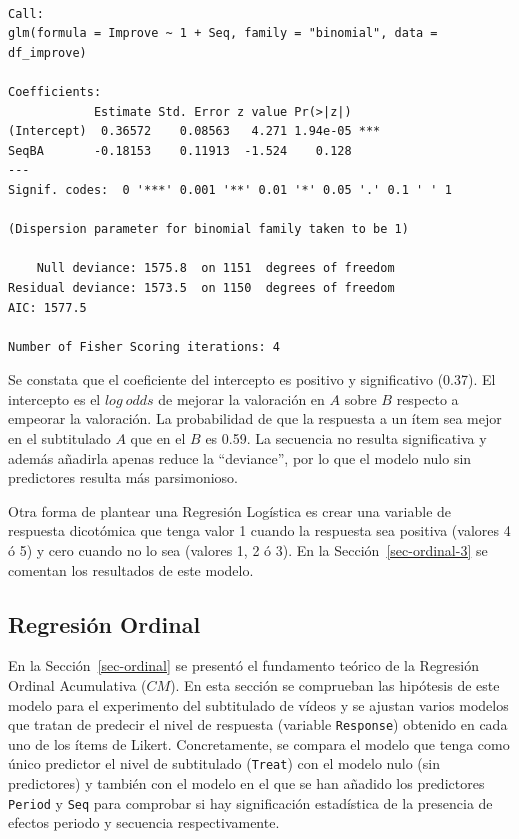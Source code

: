 \documentclass[
  12pt,
  a4paper,
  extrafontsizes,
  onecolumn,
  openright,
  table]{memoir}
\begin{document}
\begin{verbatim}

Call:
glm(formula = Improve ~ 1 + Seq, family = "binomial", data = df_improve)

Coefficients:
            Estimate Std. Error z value Pr(>|z|)    
(Intercept)  0.36572    0.08563   4.271 1.94e-05 ***
SeqBA       -0.18153    0.11913  -1.524    0.128    
---
Signif. codes:  0 '***' 0.001 '**' 0.01 '*' 0.05 '.' 0.1 ' ' 1

(Dispersion parameter for binomial family taken to be 1)

    Null deviance: 1575.8  on 1151  degrees of freedom
Residual deviance: 1573.5  on 1150  degrees of freedom
AIC: 1577.5

Number of Fisher Scoring iterations: 4
\end{verbatim}

\normalsize

Se constata que el coeficiente del intercepto es positivo y
significativo (0.37). El intercepto es el \(log\ odds\) de mejorar la
valoración en \(A\) sobre \(B\) respecto a empeorar la valoración. La
probabilidad de que la respuesta a un ítem sea mejor en el subtitulado
\(A\) que en el \(B\) es 0.59. La secuencia no resulta significativa y
además añadirla apenas reduce la \enquote{deviance}, por lo que el
modelo nulo sin predictores resulta más parsimonioso.

Otra forma de plantear una Regresión Logística es crear una variable de
respuesta dicotómica que tenga valor 1 cuando la respuesta sea positiva
(valores 4 ó 5) y cero cuando no lo sea (valores 1, 2 ó 3). En la
Sección~\ref{sec-ordinal-3} se comentan los resultados de este modelo.

\hypertarget{sec-ordinal-2}{%
\subsection{Regresión Ordinal}\label{sec-ordinal-2}}

En la Sección~\ref{sec-ordinal} se presentó el fundamento teórico de la
Regresión Ordinal Acumulativa (\(CM\)). En esta sección se comprueban
las hipótesis de este modelo para el experimento del subtitulado de
vídeos y se ajustan varios modelos que tratan de predecir el nivel de
respuesta (variable \texttt{Response}) obtenido en cada uno de los ítems
de Likert. Concretamente, se compara el modelo que tenga como único
predictor el nivel de subtitulado (\texttt{Treat}) con el modelo nulo
(sin predictores) y también con el modelo en el que se han añadido los
predictores \texttt{Period} y \texttt{Seq} para comprobar si hay
significación estadística de la presencia de efectos periodo y secuencia
respectivamente.
\end{document}
